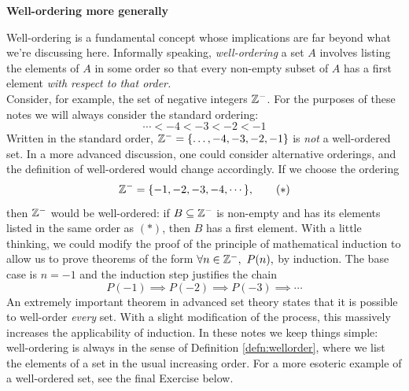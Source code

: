 
\begin{aside}{}{}
	{\bf Well-ordering more generally}
	
	Well-ordering is a fundamental concept whose implications are far beyond what we're discussing here. Informally speaking, \emph{well-ordering} a set $A$ involves listing the elements of $A$ in some order so that every non-empty subset of $A$ has a first element \emph{with respect to that order.}\\
	Consider, for example, the set of negative integers $\mathbb{Z}^-$. For the purposes of these notes we will always consider the standard ordering:
	\[
		\cdots<-4<-3<-2<-1
	\]
	Written in the standard order, $\mathbb{Z}^-=\{\ldots,-4,-3,-2,-1\}$ is \emph{not} a well-ordered set. In a more advanced discussion, one could consider alternative orderings, and the definition of well-ordered would change accordingly. If we choose the ordering
	\[
		\mathbb{Z}^-=\{-1,-2,-3,-4,\cdots\},\tag{$\ast$}
	\]
	then $\mathbb{Z}^-$ would be well-ordered: if $B\subseteq\mathbb{Z}^-$ is non-empty and has its elements listed in the same order as $(\ast)$, then $B$ has a first element. With a little thinking, we could modify the proof of the principle of mathematical induction to allow us to prove theorems of the form $\forall n\in\mathbb{Z}^-,\ P(n),$ by induction. The base case is $n=-1$ and the induction step justifies the chain
	\[
		P(-1)\implies P(-2)\implies P(-3)\implies\cdots
	\]
	An extremely important theorem in advanced set theory states that it is possible to well-order \emph{every} set. With a slight modification of the process, this massively increases the applicability of induction. In these notes we keep things simple: well-ordering is always in the sense of Definition \ref{defn:wellorder}, where we list the elements of a set in the usual increasing order. For a more esoteric example of a well-ordered set, see the final Exercise below.
\end{aside}

